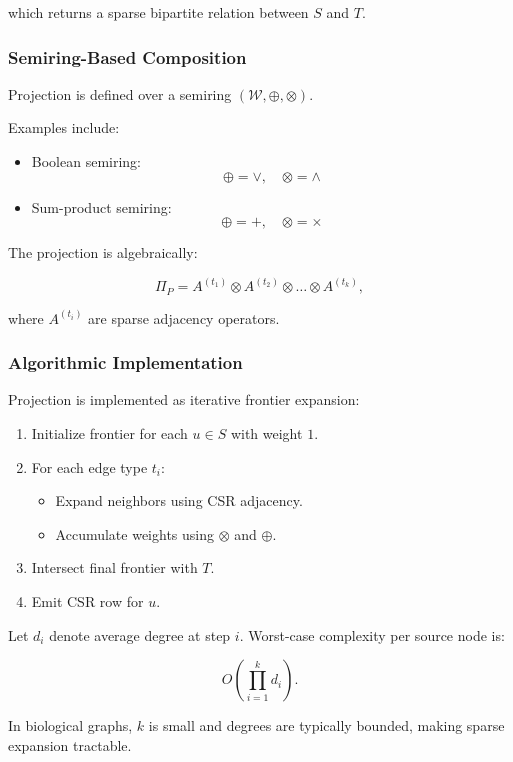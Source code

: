 \documentclass[11pt]{article}
\begin{document}
which returns a sparse bipartite relation between $S$ and $T$.

\subsubsection{Semiring-Based Composition}

Projection is defined over a semiring $(\mathcal{W}, \oplus, \otimes)$.

Examples include:

\begin{itemize}
    \item Boolean semiring:
    \[
    \oplus = \lor, \quad \otimes = \land
    \]
    \item Sum-product semiring:
    \[
    \oplus = +, \quad \otimes = \times
    \]
\end{itemize}

The projection is algebraically:

\[
\Pi_P = A^{(t_1)} \otimes A^{(t_2)} \otimes \dots \otimes A^{(t_k)},
\]

where $A^{(t_i)}$ are sparse adjacency operators.

\subsubsection{Algorithmic Implementation}

Projection is implemented as iterative frontier expansion:

\begin{enumerate}
    \item Initialize frontier for each $u \in S$ with weight $1$.
    \item For each edge type $t_i$:
    \begin{itemize}
        \item Expand neighbors using CSR adjacency.
        \item Accumulate weights using $\otimes$ and $\oplus$.
    \end{itemize}
    \item Intersect final frontier with $T$.
    \item Emit CSR row for $u$.
\end{enumerate}

Let $d_i$ denote average degree at step $i$. Worst-case complexity per source node is:

\[
O\left(\prod_{i=1}^{k} d_i \right).
\]

In biological graphs, $k$ is small and degrees are typically bounded, making sparse expansion tractable.
\end{document}
